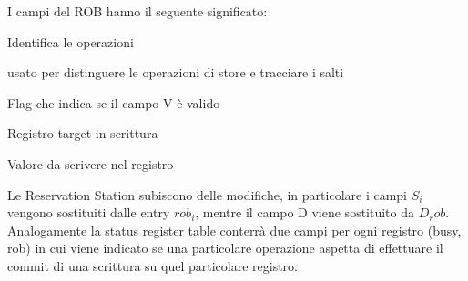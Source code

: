 \noindent I campi del ROB hanno il seguente significato:

\begin{description}[style=nextline,leftmargin=3.45cm,labelwidth=2.8cm,labelsep=0.4cm,font=\ttfamily\bfseries, itemsep=0.01em]
\item[rob \#] Identifica le operazioni 
\item[type] usato per distinguere le operazioni di store e tracciare i salti 
\item[state] Flag che indica se il campo V è valido 
\item[D] Registro target in scrittura 
\item[V] Valore da scrivere nel registro   
\end{description}

\noindent Le Reservation Station subiscono delle modifiche, in particolare i campi $S_i$ vengono sostituiti dalle entry $rob_i$, mentre il campo D viene sostituito da $D_rob$. Analogamente la status register table conterrà due campi per ogni registro (busy, rob) in cui viene indicato se una particolare operazione aspetta di effettuare il commit di una scrittura su quel particolare registro.  